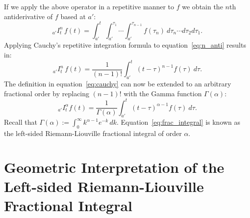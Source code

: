 \documentclass[twoside,reqno,11pt]{fcaa-var} %
\begin{document}
\noindent
If we apply the above operator in a repetitive manner to $f$ we obtain the $n$th antiderivative of $f$ based at $a'$:
\begin{equation}
\label{eq:n_anti}
_{a'}I_t^n\,f(t) = \int_{a'}^t\int_{a'}^{\tau_1}\cdots \int_{a'}^{\tau_{n-1}}f(\tau_n)~d\tau_n\cdots d\tau_2 d\tau_1.
\end{equation}
Applying Cauchy's repetitive integration formula to equation~\eqref{eq:n_anti} results in:
\begin{equation}
\label{eq:cauchy}
_{a'}I_t^n\,f(t) = \frac{1}{(n-1)!}\int_{a'}^t (t-\tau)^{n-1}f(\tau)~d\tau.
\end{equation}
The definition in equation~\eqref{eq:cauchy} can now be extended to an arbitrary fractional order by replacing $(n-1)!$ with the Gamma function $\Gamma(\alpha)$:
\begin{equation}
\label{eq:frac_integral}
_{a'}I_t^{\alpha}f(t) = \frac{1}{\Gamma(\alpha)}\int_{a'}^t (t-\tau)^{\alpha-1}f(\tau)~d\tau.
\end{equation}
Recall that $\Gamma(\alpha) := \int_0^{\infty} k^{\alpha-1} e^{-k}\,dk$. Equation~\eqref{eq:frac_integral} is known as the left-sided Riemann-Liouville fractional integral of order $\alpha$. 


\section{Geometric Interpretation of the Left-sided Riemann-Liouville Fractional Integral}
\end{document}
